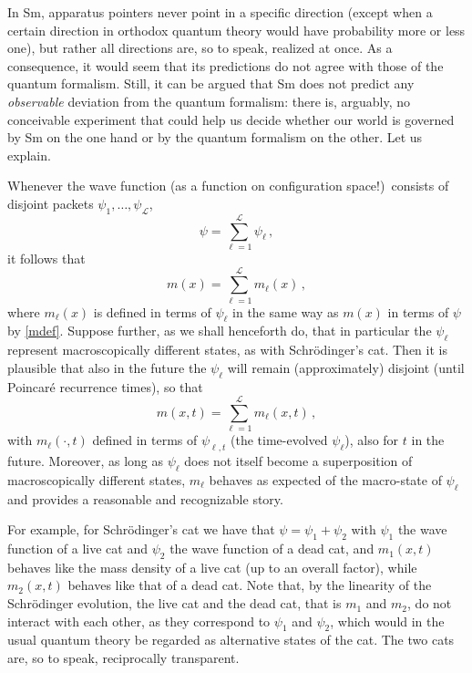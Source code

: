 \documentclass[12pt]{article}
\newcommand{\Lnum}{\mathscr{L}}
\begin{document}
In Sm, apparatus pointers never point in a specific direction (except when a certain direction in orthodox quantum theory would have probability more or less one), but rather all directions are, so to speak, realized at once.  As a consequence, it would seem that its predictions do not agree with those of the quantum formalism. Still, it can be argued that Sm does not predict any \emph{observable} deviation from the quantum formalism: there is, arguably, no conceivable experiment that could help us decide whether our world is governed by Sm on the one hand or by the quantum formalism on the other.  Let us explain. 

Whenever the wave function (as a function on configuration space!)\ consists of disjoint packets $\psi_1,\ldots,\psi_\Lnum$,
\begin{equation}\label{psiell}
\psi = \sum_{\ell=1}^\Lnum \psi_\ell\,,
\end{equation}
it follows that
\begin{equation}\label{mmell}
  m(x) = \sum_{\ell=1}^\Lnum m_\ell(x)\,,
\end{equation}
where $m_\ell(x)$ is defined in terms of $\psi_\ell$ in the same way as $m(x)$ in terms of $\psi$ by \eqref{mdef}. Suppose further, as we shall henceforth do, that in particular the $\psi_\ell$ represent macroscopically different states, as with Schr\"odinger's cat. Then it is plausible that also in the future the $\psi_\ell$ will remain (approximately) disjoint (until Poincar\'e recurrence times), so that
\begin{equation}\label{mmellt}
  m(x,t) = \sum_{\ell=1}^\Lnum m_\ell(x,t)\,,
\end{equation}
with $m_\ell(\cdot,t)$ defined in terms of $\psi_{\ell,t}$ (the time-evolved $\psi_\ell$), also for $t$ in the future. Moreover, as long as $\psi_\ell$ does not itself become a superposition of macroscopically different states, $m_\ell$ behaves as expected of the macro-state of $\psi_\ell$ and provides a reasonable and recognizable story. 

For example, for Schr\"odinger's cat we have that $\psi=\psi_1 +\psi_2$ with $\psi_1$ the wave function of a live cat and $\psi_2$ the wave function of a dead cat, and $m_1(x,t)$ behaves like the mass density of a live cat (up to an overall factor), while $m_2(x,t)$ behaves like that of a dead cat. Note that, by the linearity of the Schr\"odinger evolution, the live cat and the dead cat, that is $m_1$ and $m_2$, do not interact with each other, as they correspond to $\psi_1$ and $\psi_2$, which would in the usual quantum theory be regarded as alternative states of the cat. The two cats are, so to speak, reciprocally transparent.
\end{document}
